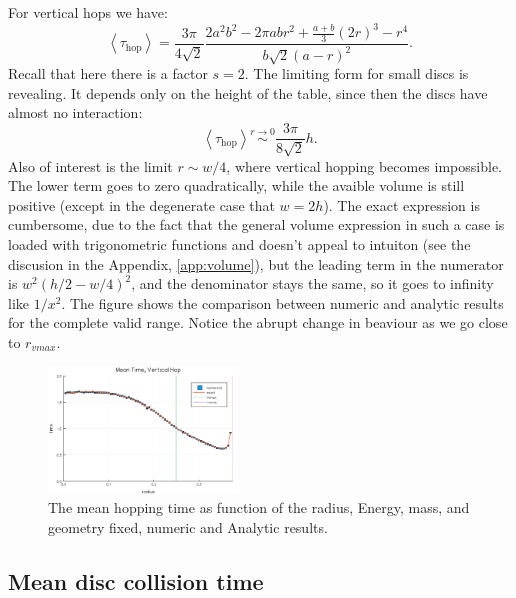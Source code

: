 \documentclass[superscriptaddress,pre,reprint,showpacs,onecolumn]{revtex4-1}
\newcommand{\mean}[1]{\left \langle #1 \right \rangle}
\begin{document}
For vertical
hops we have:
\begin{equation}\label{hoptau}
 \mean{\tau_\text{hop}} = 	
\frac{3 \pi}{4\sqrt{2}}
\frac{2 a^{2} b^{2}  - 2 \pi a b r^{2} + \textstyle \frac{a+b}{3}  (2r)^{3}  -  r^4}
{ b \sqrt{2}  ( a - r )^2}.
\end{equation}
Recall that here there is a factor $s = 2$.
The limiting form for small discs is revealing. It depends only on the height of the table, 
since then the discs have almost no interaction:
\begin{equation}\label{hoptaulimit}
 \mean{\tau_\text{hop}} \overset{r \to 0}{\sim}
\frac{3 \pi}{8\sqrt{2}}h.
\end{equation}
Also of interest is the limit $r\sim w/4$, where vertical hopping becomes
impossible.  The lower term goes to zero quadratically, while the avaible volume
is still positive (except in the degenerate case that $w=2h$). %
The exact expression
is cumbersome, due to the fact that the general volume expression in such a
case is loaded with  trigonometric functions and doesn't appeal to
intuiton (see the discusion in the Appendix, \ref{app:volume}),
but the leading term in the numerator is  $w^2(h/2-w/4)^2$, and the denominator
stays the same, so
it goes to infinity
like $1/x^2$. 
The figure \label{MeanHopp01} shows the comparison between
numeric and analytic results for the complete valid range. Notice the abrupt
change in beaviour as we go close to $r_{vmax}$.


\begin{figure}[h]
  \centering
  \includegraphics[width=0.45\textwidth]{./figures/VertHop01.png}
  \caption{The mean hopping time as function of the radius, Energy, mass, 
and geometry fixed, numeric and Analytic results.}\label{MeanHopp01}
\end{figure}

\subsection{Mean disc collision time}
\end{document}
